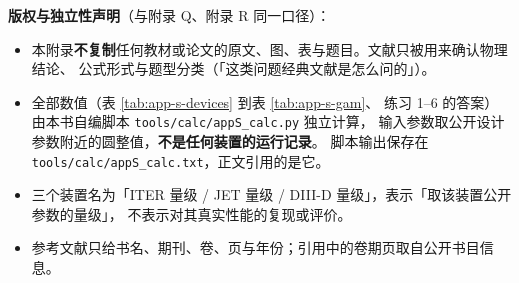 \textbf{版权与独立性声明}（与附录 Q、附录 R 同一口径）：

\begin{itemize}
  \item 本附录\textbf{不复制}任何教材或论文的原文、图、表与题目。文献只被用来确认物理结论、
        公式形式与题型分类（「这类问题经典文献是怎么问的」）。
  \item 全部数值（表 \ref{tab:app-s-devices} 到表 \ref{tab:app-s-gam}、
        练习 1--6 的答案）由本书自编脚本 \texttt{tools/\allowbreak{}calc/\allowbreak{}appS\_calc.py} 独立计算，
        输入参数取公开设计参数附近的圆整值，\textbf{不是任何装置的运行记录}。
        脚本输出保存在 \texttt{tools/\allowbreak{}calc/\allowbreak{}appS\_calc.txt}，正文引用的是它。
  \item 三个装置名为「ITER 量级 / JET 量级 / DIII-D 量级」，表示「取该装置公开参数的量级」，
        不表示对其真实性能的复现或评价。
  \item 参考文献只给书名、期刊、卷、页与年份；引用中的卷期页取自公开书目信息。
\end{itemize}
\endgroup
